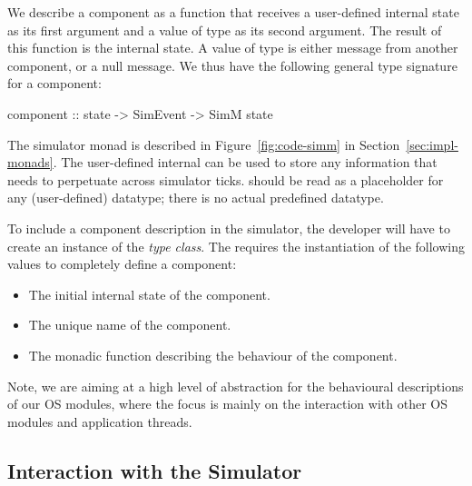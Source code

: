 We describe a component as a function that receives a user-defined internal state as its first argument and a value of type  as its second argument.
The result of this function is the internal state.
A value of type  is either message from another component, or a null message.
We thus have the following general type signature for a component:
\begin{code}
component :: state -> SimEvent -> SimM state
\end{code}

The simulator monad  is described in Figure~\ref{fig:code-simm} in Section~\ref{sec:impl-monads}.
The user-defined internal  can be used to store any information that needs to perpetuate across simulator ticks.
 should be read as a placeholder for any (user-defined) datatype; there is no actual predefined  datatype.

To include a component description in the simulator, the developer will have to create an instance of the  \emph{type class}.
The  requires the instantiation of the following values to completely define a component:

\begin{itemize}
  \item The initial internal state of the component.
  \item The unique name of the component.
  \item The monadic function describing the behaviour of the component.
\end{itemize}

Note, we are aiming at a high level of abstraction for the behavioural descriptions of our OS modules, where the focus is mainly on the interaction with other OS modules and application threads.


\subsection{Interaction with the Simulator}

%
%

